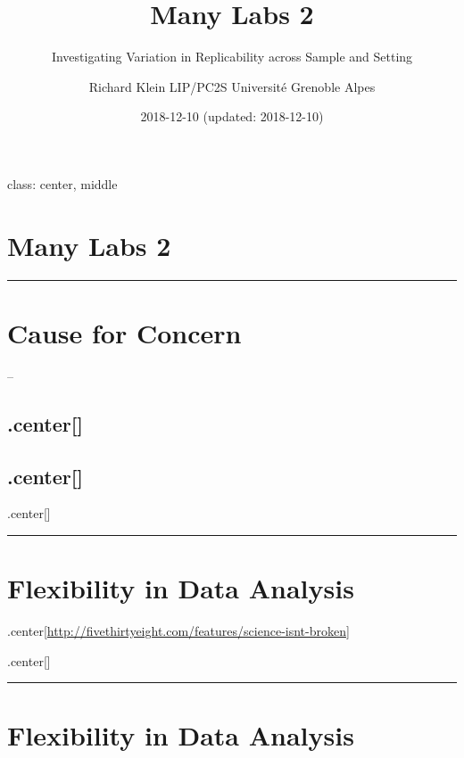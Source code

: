 \documentclass[]{article}
\title{Many Labs 2}
\subtitle{Investigating Variation in Replicability across Sample and Setting}
\author{Richard Klein LIP/PC2S Université Grenoble Alpes}
\date{2018-12-10 (updated: 2018-12-10)}
\begin{document}
\maketitle

class: center, middle

\section{Many Labs 2}\label{many-labs-2}

\begin{center}\rule{0.5\linewidth}{\linethickness}\end{center}

\section{Cause for Concern}\label{cause-for-concern}

--

\subsection{.center{[}{]}}\label{center}

\subsection{.center{[}{]}}\label{center-1}

.center{[}{]}

\begin{center}\rule{0.5\linewidth}{\linethickness}\end{center}

\section{Flexibility in Data
Analysis}\label{flexibility-in-data-analysis}

.center{[}\url{http://fivethirtyeight.com/features/science-isnt-broken}{]}

.center{[}{]}

\begin{center}\rule{0.5\linewidth}{\linethickness}\end{center}

\section{Flexibility in Data
Analysis}\label{flexibility-in-data-analysis-1}
\end{document}
